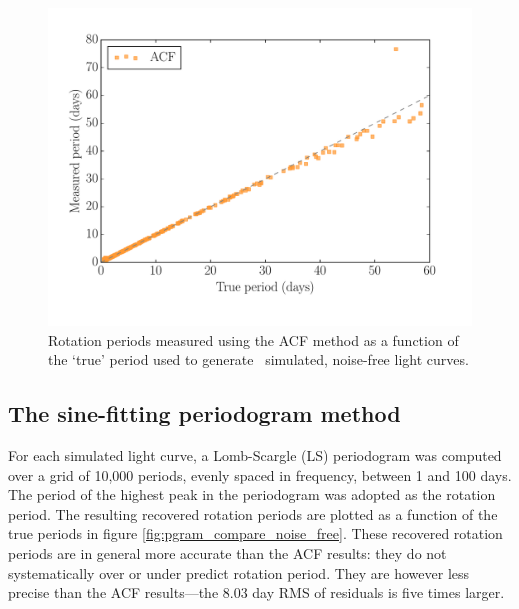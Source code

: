 \begin{figure}
\begin{center}
\includegraphics[width=6in, clip=true]{figures/compare_acf.pdf}
\caption[ACF results.]
{Rotation periods measured using the ACF method as a function of the
`true' period used to generate \nlightcurves\ simulated, noise-free light
curves.}
\label{fig:compare_noise_free}
\end{center}
\end{figure}

\subsection{The sine-fitting periodogram method}

For each simulated light curve, a Lomb-Scargle (LS) periodogram
\citep{Lomb1976, Scargle1982} was computed over a grid of 10,000 periods,
evenly spaced in frequency, between 1 and 100 days.
The period of the highest peak in the periodogram was adopted as the rotation
period.
The resulting recovered rotation periods are plotted as a function of the true
periods in figure \ref{fig:pgram_compare_noise_free}.
These recovered rotation periods are in general more accurate than the ACF
results: they do not systematically over or under predict rotation period.
They are however less precise than the ACF results---the 8.03 day RMS of
residuals is five times larger.

